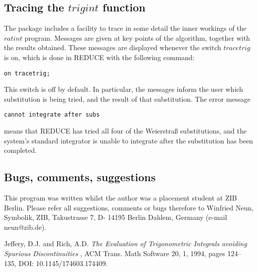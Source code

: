 \subsection{Tracing the $trigint$ function}

The package includes a facility to trace in some detail the inner workings of the $ratint$ program. Messages are given at key points of the algorithm, together with the results obtained. These messages are displayed whenever the switch $tracetrig$ is on, which is done in \small{REDUCE} \normalsize with the following command:
\begin{verbatim}
on tracetrig;
\end{verbatim}
This switch is off by default. In particular, the messages inform the user which substitution is being tried, and the result of that substitution. The error message
\begin{verbatim}
cannot integrate after subs
\end{verbatim}
means that \small{REDUCE} \normalsize has tried all four of the Weierstra\ss \hspace{1 mm} substitutions, and the system's standard integrator is unable to integrate after the substitution has been completed.

\subsection{Bugs, comments, suggestions}
This program was written whilst the author was a placement student at ZIB Berlin. Please refer all suggestions, comments or bugs therefore to Winfried Neun, Symbolik, ZIB, Takustrasse 7, D- 14195 Berlin Dahlem, Germany (e-mail neun@zib.de).

\begin{thebibliography}{99999}

 Jeffery, D.J. and Rich, A.D.
{\it The Evaluation of Trigonometric Integrals avoiding Spurious Discontinuities
}, ACM Trans. Math Software 20, 1, 1994, pages 124--135, DOI: 10.1145/174603.174409.

\end{thebibliography}
